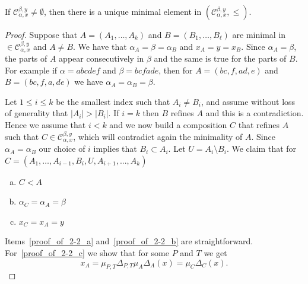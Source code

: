 \documentclass[ALCO,ThmDefs,Unicode,epreuves]{cedram}
\begin{document}
\begin{lemma}\label{le:min}
If $\mathcal{C}_{\alpha,x}^{\beta,y}\ne\emptyset$, then there is a unique minimal element in $(\mathcal{C}_{\alpha,x}^{\beta,y},\le)$.
\end{lemma}
\begin{proof} Suppose that $A=(A_1,\ldots,A_k)$ and $B=(B_1,\ldots,B_\ell)$ are minimal in $\in \mathcal{C}_{\alpha,x}^{\beta,y}$ and $A\neq B$. We have that $\alpha_A=\beta=\alpha_B$ and $x_A=y=x_B$. Since $\alpha_A=\beta$, the parts of $A$ appear consecutively in $\beta$ and the same is true for the parts of $B$. For example if $\alpha=abcdef$ and $\beta=bcfade$, then for $A=(bc,f,ad,e)$ and $B=(bc,f,a,de)$ we have $\alpha_A=\alpha_B=\beta$.

 Let $1\le i\le k$ be the smallest index such that $A_i\ne B_i$, and assume without loss of generality that $|A_i|>|B_i|$. If $i=k$ then $B$ refines $A$ and this is a contradiction. Hence we assume that $i<k$ and we now build a composition $C$ that refines $A$ such that $C\in \mathcal{C}_{\alpha,x}^{\beta,y}$, which will contradict again the minimality of $A$. Since $\alpha_A=\alpha_B$ our choice of $i$ implies that $B_i\subset A_i$.
Let $U=A_i\setminus B_i$. We claim that for $C=(A_1,\ldots,A_{i-1},B_i,U,A_{i+1},...,A_k)$
\begin{enumerate}[(a)]
\item %
\label{proof_of_2-2_a} $C<A$ 
\item %
\label{proof_of_2-2_b} $\alpha_C=\alpha_A=\beta$
\item %
\label{proof_of_2-2_c} $x_C=x_A=y$
\end{enumerate}
Items~\ref{proof_of_2-2_a} and~\ref{proof_of_2-2_b} are straightforward. For~\ref{proof_of_2-2_c} we show that for some $P$ and $T$ we get
\begin{equation}\label{eq:xCisxA}
x_A=\mu_{P,T}\Delta_{P,T}\mu_A\Delta_A(x)=\mu_C\Delta_C(x).
\end{equation}


\end{proof}
\end{document}
